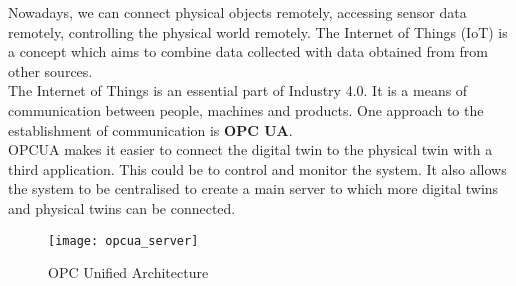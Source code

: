 Nowadays, we can connect physical objects remotely, accessing sensor data remotely, controlling the physical world remotely. The
Internet of Things (IoT) is a concept which aims to combine data collected with data obtained from
from other sources.\cite{arnarson2019digital}
\\ The Internet of Things is an essential part of Industry 4.0. It is a means of communication between people, machines and products. 
One approach to the establishment of communication is \textbf{OPC UA}.\cite{arnarson2019digital}
\\ OPCUA makes it easier to connect the digital twin to the physical twin with a third application. This could be to control and monitor the system.\cite{overn2018industry}
It also allows the system to be centralised to create a main server to which more digital twins and physical twins can be connected.\cite{overn2018industry}

\begin{figure}[h]
    \centering
    \texttt{[image: opcua\_server]}
    \caption{OPC Unified Architecture }
    \label{fig:mesh3}
\end{figure}

